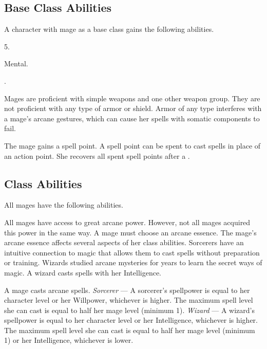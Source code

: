     \subsection{Base Class Abilities}
        A character with mage as a base class gains the following abilities.

         5.

          Mental.

         .

        Mages are proficient with simple weapons and one other weapon group.
        They are not proficient with any type of armor or shield.
        Armor of any type interferes with a mage's arcane gestures, which can cause her spells with somatic components to fail.

        The mage gains a spell point.
        A spell point can be spent to cast spells in place of an action point.
        She recovers all spent spell points after a .

    \subsection{Class Abilities}
        All mages have the following abilities.

        All mages have access to great arcane power.
        However, not all mages acquired this power in the same way.
        A mage must choose an arcane essence.
        The mage's arcane essence affects several aspects of her class abilities.
         Sorcerers have an intuitive connection to magic that allows them to cast spells without preparation or training.
         Wizards studied arcane mysteries for years to learn the secret ways of magic.
        A wizard casts spells with her Intelligence.

        A mage casts arcane spells.
        \textit{Sorcerer} --- A sorcerer's spellpower is equal to her character level or her Willpower, whichever is higher.
        The maximum spell level she can cast is equal to half her mage level (minimum 1).
        \textit{Wizard} --- A wizard's spellpower is equal to her character level or her Intelligence, whichever is higher.
        The maximum spell level she can cast is equal to half her mage level (minimum 1) or her Intelligence, whichever is lower.


